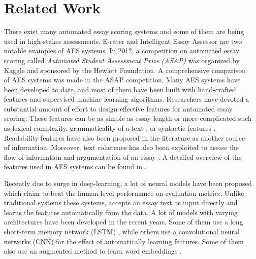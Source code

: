 \documentclass[11pt,a4paper]{article}
\begin{document}


\section{Related Work}

There exist many automated essay scoring systems \cite{shermis2013handbook} and some of them are being used in high-stakes assessments. E-rater \cite{attali2004automated} and Intelligent Essay Assessor \cite{foltz1999intelligent} are two notable examples of AES systems. In 2012, a competition on automated essay scoring called \textit{Automated Student Assessment Prize (ASAP)} was organized by Kaggle and sponsored by the Hewlett Foundation. A comprehensive comparison of AES systems was made in the ASAP competition. Many AES systems have been developed to date, and most of them have been built with hand-crafted features and supervised machine learning algorithms. Researchers have devoted a substantial amount of effort to design effective features for automated essay scoring. These features can be as simple as essay length \cite{chen2013automated} or more complicated such as lexical complexity, grammaticality of a text \cite{attali2004automated}, or syntactic features \cite{chen2013automated}. Readability features \cite{zesch2015task} have also been proposed in the literature as another source of information. Moreover, text coherence has also been exploited to assess the flow of information and argumentation of an essay \cite{chen2013automated}. A detailed overview of the features used in AES systems can be found in \cite{zesch2015task}. 

Recently due to surge in deep-learning, a lot of neural models have been proposed which claim to beat the human level performance on evaluation metrics. Unlike traditional systems these systems, accepts an essay text as input directly and learns the features automatically from the data. A lot of models with varying architectures have been developed in the recent years. Some of them use a long short-term memory network (LSTM) \cite{taghipour2016neural}, while others use a convolutional neural networks (CNN) \cite{dong2016automatic} for the effect of automatically learning features. Some of them also use an augmented method to learn word embeddings \cite{alikaniotis2016automatic}. 
\end{document}
